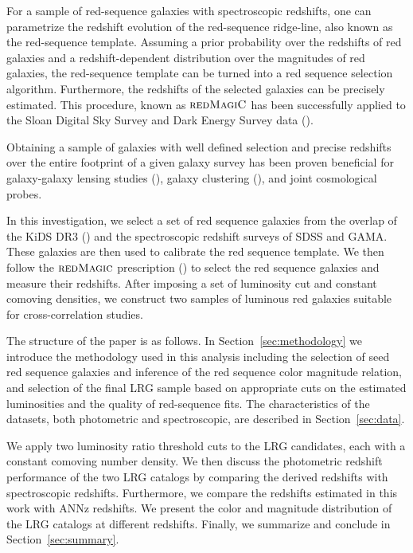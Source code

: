 \documentclass[fleqn,usenatbib]{mnras}
\begin{document}
For a sample of red-sequence galaxies with spectroscopic redshifts, one can parametrize the redshift evolution of the red-sequence ridge-line, also known as the red-sequence template. Assuming a prior probability over the redshifts of red galaxies and a redshift-dependent distribution over the magnitudes of red galaxies, the red-sequence template can be turned into a red sequence selection algorithm. Furthermore, the redshifts of the selected galaxies can be precisely estimated. This procedure, known as $\textsc{redMagiC}$ has been successfully applied to the Sloan Digital Sky Survey and Dark Energy Survey data (\citealt{rozo2016}).

Obtaining a sample of galaxies with well defined selection and precise redshifts over the entire footprint of a given galaxy survey has been proven beneficial for galaxy-galaxy lensing studies (\citealt{clampitt2017,prat2017}), galaxy clustering (\citealt{elvin2017}), and joint cosmological probes. 

In this investigation, we select a set of red sequence galaxies from the overlap of the KiDS DR3 (\citealt{kids_dr3}) and the spectroscopic redshift surveys of SDSS and GAMA. These galaxies are then used to calibrate the red sequence template. We then follow the $\textsc{redMagic}$ prescription (\citealt{rozo2016}) to select the red sequence galaxies and measure their redshifts. After imposing a set of luminosity cut and constant comoving densities, we construct two samples of luminous red galaxies suitable for cross-correlation studies.  

The structure of the paper is as follows. In Section~\ref{sec:methodology} we introduce the methodology used in this analysis including the selection of seed red sequence galaxies and inference of the red sequence color magnitude relation, and selection of the final LRG sample based on appropriate cuts on the estimated luminosities and the quality of red-sequence fits. The characteristics of the datasets, both photometric and spectroscopic, are described in Section~\ref{sec:data}.  

We apply two luminosity ratio threshold cuts to the LRG candidates, each with a constant comoving number density. 
We then discuss the photometric redshift performance of the two LRG catalogs by comparing the derived redshifts with spectroscopic redshifts. Furthermore, we compare the redshifts estimated in this work with ANNz redshifts. 
We present the color and magnitude distribution of the LRG catalogs at different redshifts. Finally, we summarize and conclude in Section~\ref{sec:summary}.
\end{document}
